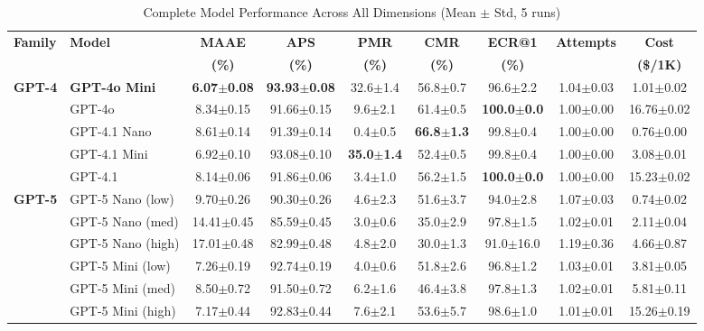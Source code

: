 \documentclass[letterpaper]{article} %
\begin{document}
\begin{table}[t]
\centering
\caption{Complete Model Performance Across All Dimensions (Mean $\pm$ Std, 5 runs)}
\label{tab:combined_results}
\scriptsize
\begin{threeparttable}
\begin{tabular}{@{}llccccccc@{}}
\toprule
\textbf{Family} & \textbf{Model} & \textbf{MAAE} & \textbf{APS} & \textbf{PMR} & \textbf{CMR} & \textbf{ECR@1} & \textbf{Attempts} & \textbf{Cost} \\
 & & \textbf{(\%)} & \textbf{(\%)} & \textbf{(\%)} & \textbf{(\%)} & \textbf{(\%)} &  & \textbf{(\$/1K)} \\
\midrule
\multirow{5}{*}{\textbf{GPT-4}} 
& \rowcolor{yellow!20} \textbf{GPT-4o Mini} & \textbf{6.07$\pm$0.08} & \textbf{93.93$\pm$0.08} & 32.6$\pm$1.4 & 56.8$\pm$0.7 & 96.6$\pm$2.2 & 1.04$\pm$0.03 & 1.01$\pm$0.02 \\
& GPT-4o & 8.34$\pm$0.15 & 91.66$\pm$0.15 & 9.6$\pm$2.1 & 61.4$\pm$0.5 & \textbf{100.0$\pm$0.0} & 1.00$\pm$0.00 & 16.76$\pm$0.02 \\
& GPT-4.1 Nano & 8.61$\pm$0.14 & 91.39$\pm$0.14 & 0.4$\pm$0.5 & \textbf{66.8$\pm$1.3} & 99.8$\pm$0.4 & 1.00$\pm$0.00 & 0.76$\pm$0.00 \\
& GPT-4.1 Mini & 6.92$\pm$0.10 & 93.08$\pm$0.10 & \textbf{35.0$\pm$1.4} & 52.4$\pm$0.5 & 99.8$\pm$0.4 & 1.00$\pm$0.00 & 3.08$\pm$0.01 \\
& GPT-4.1 & 8.14$\pm$0.06 & 91.86$\pm$0.06 & 3.4$\pm$1.0 & 56.2$\pm$1.5 & \textbf{100.0$\pm$0.0} & 1.00$\pm$0.00 & 15.23$\pm$0.02 \\
\midrule
\multirow{9}{*}{\textbf{GPT-5}} 
& GPT-5 Nano (low) & 9.70$\pm$0.26 & 90.30$\pm$0.26 & 4.6$\pm$2.3 & 51.6$\pm$3.7 & 94.0$\pm$2.8 & 1.07$\pm$0.03 & 0.74$\pm$0.02 \\
& GPT-5 Nano (med) & 14.41$\pm$0.45 & 85.59$\pm$0.45 & 3.0$\pm$0.6 & 35.0$\pm$2.9 & 97.8$\pm$1.5 & 1.02$\pm$0.01 & 2.11$\pm$0.04 \\
& GPT-5 Nano (high) & 17.01$\pm$0.48 & 82.99$\pm$0.48 & 4.8$\pm$2.0 & 30.0$\pm$1.3 & 91.0$\pm$16.0 & 1.19$\pm$0.36 & 4.66$\pm$0.87 \\
& GPT-5 Mini (low) & 7.26$\pm$0.19 & 92.74$\pm$0.19 & 4.0$\pm$0.6 & 51.8$\pm$2.6 & 96.8$\pm$1.2 & 1.03$\pm$0.01 & 3.81$\pm$0.05 \\
& GPT-5 Mini (med) & 8.50$\pm$0.72 & 91.50$\pm$0.72 & 6.2$\pm$1.6 & 46.4$\pm$3.8 & 97.8$\pm$1.3 & 1.02$\pm$0.01 & 5.81$\pm$0.11 \\
& GPT-5 Mini (high) & 7.17$\pm$0.44 & 92.83$\pm$0.44 & 7.6$\pm$2.1 & 53.6$\pm$5.7 & 98.6$\pm$1.0 & 1.01$\pm$0.01 & 15.26$\pm$0.19 \\

\end{tabular}
\end{threeparttable}
\end{table}
\end{document}
